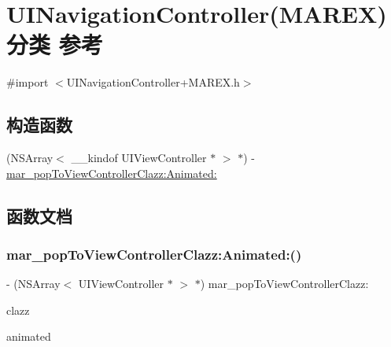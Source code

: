 \hypertarget{category_u_i_navigation_controller_07_m_a_r_e_x_08}{}\section{U\+I\+Navigation\+Controller(M\+A\+R\+EX)分类 参考}
\label{category_u_i_navigation_controller_07_m_a_r_e_x_08}


{\ttfamily \#import $<$U\+I\+Navigation\+Controller+\+M\+A\+R\+E\+X.\+h$>$}

\subsection*{构造函数}
\begin{DoxyCompactItemize}
\item 
(N\+S\+Array$<$ \+\_\+\+\_\+kindof U\+I\+View\+Controller $\ast$ $>$ $\ast$) -\/ \hyperlink{category_u_i_navigation_controller_07_m_a_r_e_x_08_aec79ebf7b6200aeb34f8f583c88b4b43}{mar\+\_\+pop\+To\+View\+Controller\+Clazz\+:\+Animated\+:}
\end{DoxyCompactItemize}


\subsection{函数文档}
\mbox{\label{category_u_i_navigation_controller_07_m_a_r_e_x_08_aec79ebf7b6200aeb34f8f583c88b4b43}} 
\subsubsection{\texorpdfstring{mar\+\_\+pop\+To\+View\+Controller\+Clazz\+:\+Animated\+:()}{mar\_popToViewControllerClazz:Animated:()}}
{\footnotesize\ttfamily -\/ (N\+S\+Array$<$ U\+I\+View\+Controller $\ast$ $>$ $\ast$) mar\+\_\+pop\+To\+View\+Controller\+Clazz\+: \begin{DoxyParamCaption}\item[{(Class)}]{clazz }\item[{Animated:(B\+O\+OL)}]{animated }\end{DoxyParamCaption}}

